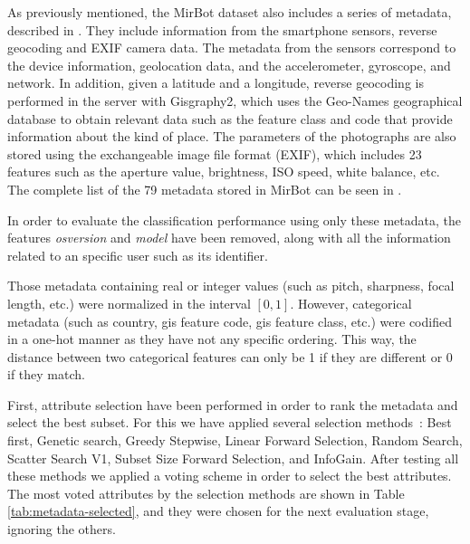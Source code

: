 \documentclass[final, twocolumn]{elsarticle}
\begin{document}
As previously mentioned, the MirBot dataset also includes a series of metadata, described in \cite{MirBot:System}. They include information from the smartphone sensors, reverse geocoding and EXIF camera data.
The metadata from the sensors correspond to the device information, geolocation data, and the accelerometer, gyroscope, and network. In addition, given a latitude and a longitude, reverse geocoding is performed in the server with Gisgraphy2, which uses the Geo-Names geographical database to obtain relevant data such as the feature class and code that provide information about the kind of place. The parameters of the photographs are also stored using the  exchangeable image file format (EXIF), which includes 23 features such as the aperture value, brightness, ISO speed, white balance, etc. The complete list of the 79 metadata stored in MirBot can be seen in \cite{MirBot:System}.

In order to evaluate the classification performance using only these metadata, the features \textit{osversion} and \textit{model} have been removed, along with all the information related to an specific user such as its identifier.

Those metadata containing real or integer values (such as pitch, sharpness, focal length, etc.) were normalized in the interval $[0,1]$. However, categorical metadata (such as country, gis feature code, gis feature class, etc.) were codified in a one-hot manner as they have not any specific ordering. This way, the distance between two categorical features can only be 1 if they are different or 0 if they match.


First, attribute selection have been performed in order to rank the metadata and select the best subset. For this we have applied several selection methods~\cite{weka}: %
Best first, Genetic search, Greedy Stepwise, Linear Forward Selection, Random Search, Scatter Search V1, Subset Size Forward Selection, and InfoGain. %
%
After testing all these methods we applied a voting scheme in order to select the best attributes. The most voted attributes by the selection methods are shown in Table \ref{tab:metadata-selected}, and they were chosen for the next evaluation stage, ignoring the others.

\end{document}
